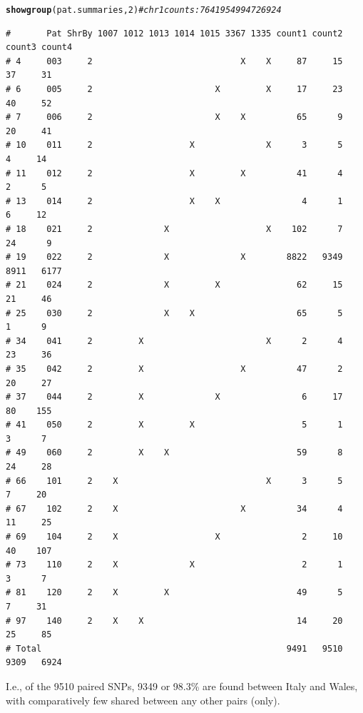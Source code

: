 \documentclass{article}\usepackage[]{graphicx}\usepackage[]{color}
\makeatletter
\newcommand{\hlnum}[1]{\textcolor[rgb]{0.686,0.059,0.569}{#1}}%
\newcommand{\hlcom}[1]{\textcolor[rgb]{0.678,0.584,0.686}{\textit{#1}}}%
\newcommand{\hlstd}[1]{\textcolor[rgb]{0.345,0.345,0.345}{#1}}%
\newcommand{\hlkwd}[1]{\textcolor[rgb]{0.737,0.353,0.396}{\textbf{#1}}}%
\newenvironment{kframe}{%
 \def\at@end@of@kframe{}%
 \ifinner\ifhmode%
  \def\at@end@of@kframe{\end{minipage}}%
  \begin{minipage}{\columnwidth}%
 \fi\fi%
 \def\FrameCommand##1{\hskip\@totalleftmargin \hskip-\fboxsep
 \colorbox{shadecolor}{##1}\hskip-\fboxsep
     \hskip-\linewidth \hskip-\@totalleftmargin \hskip\columnwidth}%
 \MakeFramed {\advance\hsize-\width
   \@totalleftmargin\z@ \linewidth\hsize
   \@setminipage}}%
 {\par\unskip\endMakeFramed%
 \at@end@of@kframe}
\newenvironment{knitrout}{}{} %
\makeatother
\begin{document}
\begin{knitrout}\footnotesize
{}\color{fgcolor}\begin{kframe}
\begin{alltt}
\hlkwd{showgroup}\hlstd{(pat.summaries,}\hlnum{2}\hlstd{)} \hlcom{# chr 1 counts: 7641   9549   9472  6924}
\end{alltt}
\begin{verbatim}
#       Pat ShrBy 1007 1012 1013 1014 1015 3367 1335 count1 count2 count3 count4
# 4     003     2                             X    X     87     15     37     31
# 6     005     2                        X         X     17     23     40     52
# 7     006     2                        X    X          65      9     20     41
# 10    011     2                   X              X      3      5      4     14
# 11    012     2                   X         X          41      4      2      5
# 13    014     2                   X    X                4      1      6     12
# 18    021     2              X                   X    102      7     24      9
# 19    022     2              X              X        8822   9349   8911   6177
# 21    024     2              X         X               62     15     21     46
# 25    030     2              X    X                    65      5      1      9
# 34    041     2         X                        X      2      4     23     36
# 35    042     2         X                   X          47      2     20     27
# 37    044     2         X              X                6     17     80    155
# 41    050     2         X         X                     5      1      3      7
# 49    060     2         X    X                         59      8     24     28
# 66    101     2    X                             X      3      5      7     20
# 67    102     2    X                        X          34      4     11     25
# 69    104     2    X                   X                2     10     40    107
# 73    110     2    X              X                     2      1      3      7
# 81    120     2    X         X                         49      5      7     31
# 97    140     2    X    X                              14     20     25     85
# Total                                                9491   9510   9309   6924
\end{verbatim}
\end{kframe}
\end{knitrout}

I.e., of the 9510 paired SNPs, 9349 or
98.3\% are found between Italy
and Wales, with comparatively few shared between any other pairs (only).
\end{document}
